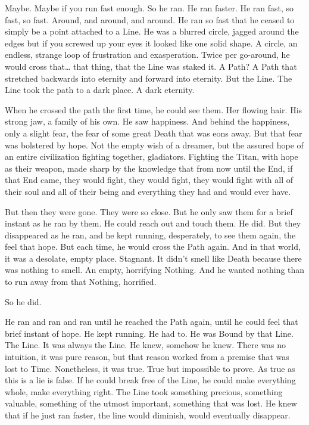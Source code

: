 Maybe. Maybe if you run fast enough. So he ran. He ran faster. He ran fast, so fast, so fast. Around, and around, and around. He ran so fast that he ceased to simply be a point attached to a Line. He was a blurred circle, jagged around the edges but if you screwed up your eyes it looked like one solid shape. A circle, an endless, strange loop of frustration and exasperation. Twice per go-around, he would cross that… that thing, that the Line was staked it. A Path? A Path that stretched backwards into eternity and forward into eternity. But the Line. The Line took the path to a dark place. A dark eternity.

When he crossed the path the first time, he could see them. Her flowing hair. His strong jaw, a family of his own. He saw happiness. And behind the happiness, only a slight fear, the fear of some great Death that was eons away. But that fear was bolstered by hope. Not the empty wish of a dreamer, but the assured hope of an entire civilization fighting together, gladiators. Fighting the Titan, with hope as their weapon, made sharp by the knowledge that from now until the End, if that End came, they would fight, they would fight, they would fight with all of their soul and all of their being and everything they had and would ever have.

But then they were gone. They were so close. But he only saw them for a brief instant as he ran by them. He could reach out and touch them. He did. But they disappeared as he ran, and he kept running, desperately, to see them again, the feel that hope. But each time, he would cross the Path again. And in that world, it was a desolate, empty place. Stagnant. It didn’t smell like Death because there was nothing to smell. An empty, horrifying Nothing. And he wanted nothing than to run away from that Nothing, horrified.

So he did.

He ran and ran and ran until he reached the Path again, until he could feel that brief instant of hope. He kept running. He had to. He was Bound by that Line. The Line. It was always the Line. He knew, somehow he knew. There was no intuition, it was pure reason, but that reason worked from a premise that was lost to Time. Nonetheless, it was true. True but impossible to prove. As true as this is a lie is false. If he could break free of the Line, he could make everything whole, make everything right. The Line took something precious, something valuable, something of the utmost important, something that was lost. He knew that if he just ran faster, the line would diminish, would eventually disappear.

